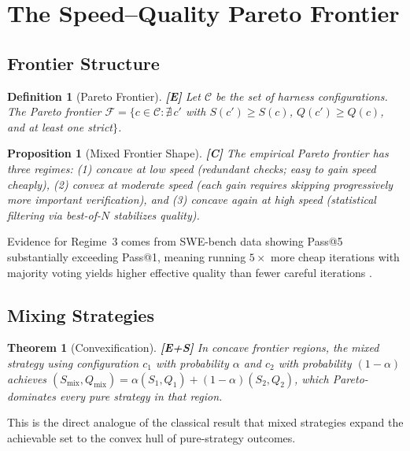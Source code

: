\documentclass[11pt, a4paper, copyright]{googledeepmind}
\newtheorem{definition}{Definition}[section]
\newtheorem{theorem}{Theorem}[section]
\newtheorem{proposition}{Proposition}[section]
\begin{document}
\section{The Speed--Quality Pareto Frontier}\label{sec:pareto}

\subsection{Frontier Structure}

\begin{definition}[Pareto Frontier]\label{def:pareto}
\textbf{[E]} Let $\mathcal{C}$ be the set of harness configurations. The Pareto frontier $\mathcal{F} = \{c \in \mathcal{C} : \nexists\, c'$ with $S(c') \geq S(c)$, $Q(c') \geq Q(c)$, and at least one strict$\}$.
\end{definition}

\begin{proposition}[Mixed Frontier Shape]\label{prop:shape}
\textbf{[C]} The empirical Pareto frontier has three regimes: (1) concave at low speed (redundant checks; easy to gain speed cheaply), (2) convex at moderate speed (each gain requires skipping progressively more important verification), and (3) concave again at high speed (statistical filtering via best-of-$N$ stabilizes quality).
\end{proposition}

Evidence for Regime~3 comes from SWE-bench data showing Pass@5 substantially exceeding Pass@1, meaning running $5\times$ more cheap iterations with majority voting yields higher effective quality than fewer careful iterations \citep{sweeffi2025}.

\subsection{Mixing Strategies}

\begin{theorem}[Convexification]\label{thm:convex}
\textbf{[E+S]} In concave frontier regions, the mixed strategy using configuration $c_1$ with probability $\alpha$ and $c_2$ with probability $(1-\alpha)$ achieves $(S_{\mathrm{mix}}, Q_{\mathrm{mix}}) = \alpha(S_1, Q_1) + (1-\alpha)(S_2, Q_2)$, which Pareto-dominates every pure strategy in that region.
\end{theorem}

This is the direct analogue of the classical result that mixed strategies expand the achievable set to the convex hull of pure-strategy outcomes.
\end{document}
